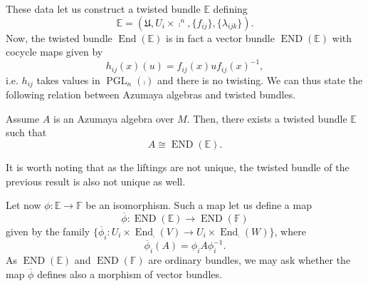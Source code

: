 These data let us construct a twisted bundle $\mathbb{E}$ defining
$$\mathbb{E}=(\mathfrak{U},U_i\times \comp^n,\{f_{ij}\},\{\lambda_{ijk}\}).$$
Now, the twisted bundle $\operatorname{End}(\mathbb{E})$ is in fact a vector bundle $\operatorname{END}(\mathbb{E})$ with cocycle maps given by
$$h_{ij}(x)(u)=f_{ij}(x)uf_{ij}(x)^{-1},$$
i.e. $h_{ij}$ takes values in $\operatorname{PGL}_n(\comp )$ and there is no twisting. We can thus state the following relation between Azumaya algebras and twisted bundles.

\begin{theorem}
\label{tvb_azumaya}
Assume $A$ is an Azumaya algebra over $M$. Then, there exists a twisted bundle $\mathbb{E}$ such that
$$A\cong \operatorname{END}(\mathbb{E}).$$
\end{theorem}

\begin{obs}
It is worth noting that as the liftings are not unique, the twisted bundle of the previous result is also not unique as well.
\end{obs}

Let now $\phi :\mathbb{E}\to \mathbb{F}$ be an isomorphism. Such a map let us define a map
$$\overline{\phi}:\operatorname{END}(\mathbb{E})\longrightarrow \operatorname{END}(\mathbb{F})$$
given by the family $\{\overline{\phi}_i:U_i\times \operatorname{End}_{\comp}(V)\to U_i\times \operatorname{End}_{\comp}(W)\}$, where
$$\overline{\phi}_i(A)=\phi_iA\phi_i^{-1}.$$
As $\operatorname{END}(\mathbb{E})$ and $\operatorname{END}(\mathbb{F})$ are ordinary bundles, we may ask whether the map $\overline{\phi}$ defines also a morphism of vector bundles.

